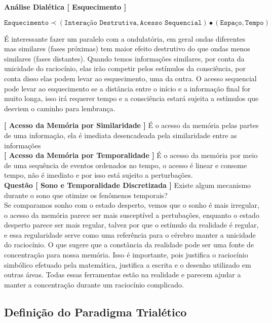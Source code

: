 \documentclass[10pt,a4paper]{report}
\begin{document}
\textbf{Análise Dialética [ Esquecimento ]}

$$ \texttt{Esquecimento} \prec (\texttt{Interação Destrutiva}, \texttt{Acesso Sequencial}) \bullet (\texttt{Espaço}, \texttt{Tempo}) $$

\hrulefill

É interessante fazer um paralelo com a ondulatória, em geral ondas diferentes mas similares (fases próximas) tem maior efeito destrutivo do que ondas menos similares (fases distantes). Quando temos informações similares, por conta da unicidade do raciocínio, elas irão competir pelos estímulos da consciência, por conta disso elas podem levar ao esquecimento, uma da outra. O acesso sequencial pode levar ao esquecimento se a distância entre o início e a informação final for muito longa, isso irá requerer tempo e a consciência estará sujeita a estímulos que desviem o caminho para lembrança.

\hspace{\baselineskip}

\textbf{[ Acesso da Memória por Similaridade ]} É o acesso da memória pelas partes de uma informação, ela é imediata desencadeada pela similaridade entre as informações\\

\textbf{[ Acesso da Memória por Temporalidade ]} É o acesso da memória por meio de uma sequência de eventos ordenados no tempo, o acesso é linear e consome tempo, não é imediato e por isso está sujeito a perturbações.\\

\textbf{Questão [ Sono e Temporalidade Discretizada ]} Existe algum mecanismo durante o sono que otimize os fenômenos temporais?\\

Se comparamos sonho com o estado desperto, vemos que o sonho é mais irregular, o acesso da memória parece ser mais susceptível a pertubações, enquanto o estado desperto parece ser mais regular, talvez por que o estímulo da realidade é regular, e essa regularidade serve como uma referência para o cérebro manter a unicidade do raciocínio. O que sugere que a constância da realidade pode ser uma fonte de concentração para nossa memória. Isso é importante, pois justifica o raciocínio simbólico efetuado pela matemática, justifica a escrita e o desenho utilizado em outras áreas. Todas essas ferramentas estão na realidade e parecem ajudar a manter a concentração durante um raciocínio complicado.\\


\subsection{Definição do Paradigma Trialético}
\end{document}

